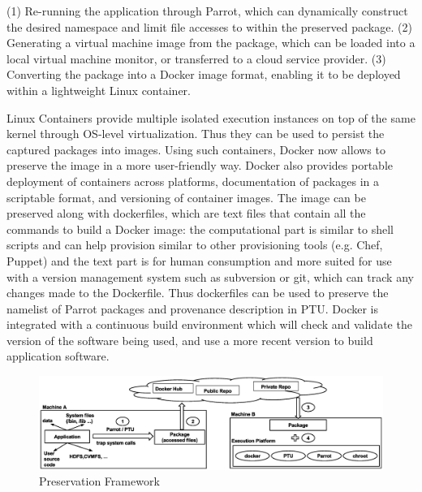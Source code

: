 (1) Re-running the application through Parrot, which can dynamically construct
the desired namespace and limit file accesses to within the preserved package.
(2) Generating a virtual machine image from the package, which can be loaded
into a local virtual machine monitor, or transferred to a cloud service provider.
(3) Converting the package into a Docker image format, enabling it to be
deployed within a lightweight Linux container.

\vspace{5pt}
 Linux Containers provide multiple isolated execution instances on top of the same kernel through OS-level virtualization. Thus they can be used to persist the captured packages into images. 
Using such containers, Docker now allows to preserve the image in a more user-friendly way. 
Docker also provides portable deployment of containers across platforms, documentation of packages in a scriptable format, and versioning of container images. The image can be preserved along with dockerfiles, which are text files that contain all the commands to build a Docker image: the computational part is similar to shell scripts and can help provision similar to other provisioning tools (e.g. Chef, Puppet) and the text part is for human consumption and more suited for use with a version management system such as subversion or git, which can track any changes made to the Dockerfile. Thus dockerfiles can be used to preserve the namelist of Parrot packages and provenance description in PTU. 
Docker is integrated with a continuous build environment which will check and validate the version of the software being used, and use a more recent version to build application software. 

\begin{figure}
\centering
\includegraphics[width=1.0\textwidth]{preservation_framework.eps}
\caption{Preservation Framework}
\label{fig: preservation_framework}
\end{figure}

